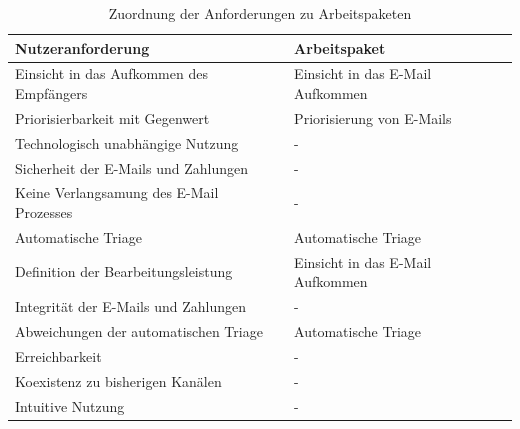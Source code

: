 \begin{table}[!h]
\centering
\caption[Arbeitspakete der Implementation]{Zuordnung der Anforderungen zu Arbeitspaketen}
\begin{tabular}{|l|l|}
\rowcolor{red!25}
\hline
\textbf{Nutzeranforderung}               & \textbf{Arbeitspaket}            \\ \hline
Einsicht in das Aufkommen des Empfängers & Einsicht in das E-Mail Aufkommen \\ \hline
Priorisierbarkeit mit Gegenwert          & Priorisierung von E-Mails        \\ \hline
Technologisch unabhängige Nutzung        & -                                \\ \hline
Sicherheit der E-Mails und Zahlungen     & -                                \\ \hline
Keine Verlangsamung des E-Mail Prozesses & -                                \\ \hline
Automatische Triage                      & Automatische Triage              \\ \hline
Definition der Bearbeitungsleistung      & Einsicht in das E-Mail Aufkommen \\ \hline
Integrität der E-Mails und Zahlungen     & -                                \\ \hline
Abweichungen der automatischen Triage    & Automatische Triage              \\ \hline
Erreichbarkeit                           & -                                \\ \hline
Koexistenz zu bisherigen Kanälen         & -                                \\ \hline
Intuitive Nutzung                        & -                                \\ \hline
\end{tabular}
\label{tab:arbeitspakete}
\end{table}

